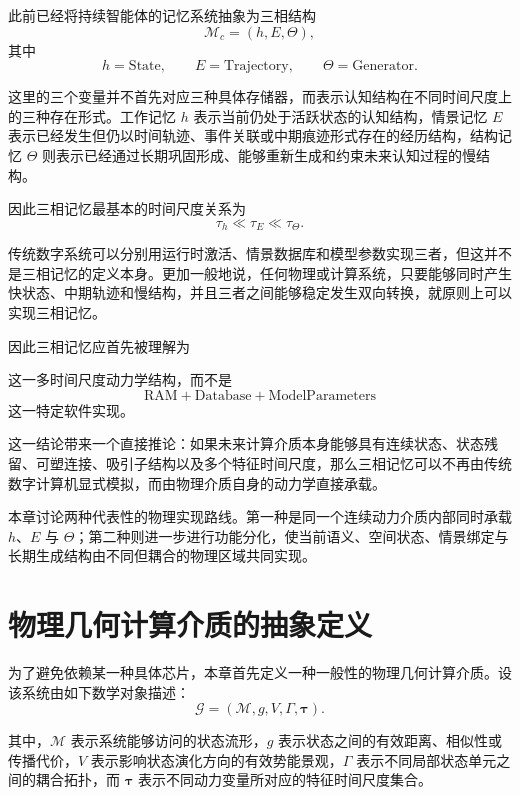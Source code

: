 此前已经将持续智能体的记忆系统抽象为三相结构
\[
\mathcal{M}_c=(h,E,\Theta),
\]
其中
\[
h=\mathrm{State},
\qquad
E=\mathrm{Trajectory},
\qquad
\Theta=\mathrm{Generator}.
\]

这里的三个变量并不首先对应三种具体存储器，而表示认知结构在不同时间尺度上的三种存在形式。工作记忆 $h$ 表示当前仍处于活跃状态的认知结构，情景记忆 $E$ 表示已经发生但仍以时间轨迹、事件关联或中期痕迹形式存在的经历结构，结构记忆 $\Theta$ 则表示已经通过长期巩固形成、能够重新生成和约束未来认知过程的慢结构。

因此三相记忆最基本的时间尺度关系为
\[
\tau_h \ll \tau_E \ll \tau_\Theta.
\]

传统数字系统可以分别用运行时激活、情景数据库和模型参数实现三者，但这并不是三相记忆的定义本身。更加一般地说，任何物理或计算系统，只要能够同时产生快状态、中期轨迹和慢结构，并且三者之间能够稳定发生双向转换，就原则上可以实现三相记忆。

因此三相记忆应首先被理解为
\begin{statementbox}
\centering
{}
\end{statementbox}
这一多时间尺度动力学结构，而不是
\[
\mathrm{RAM}
+
\mathrm{Database}
+
\mathrm{ModelParameters}
\]
这一特定软件实现。

这一结论带来一个直接推论：如果未来计算介质本身能够具有连续状态、状态残留、可塑连接、吸引子结构以及多个特征时间尺度，那么三相记忆可以不再由传统数字计算机显式模拟，而由物理介质自身的动力学直接承载。

本章讨论两种代表性的物理实现路线。第一种是同一个连续动力介质内部同时承载 $h$、$E$ 与 $\Theta$；第二种则进一步进行功能分化，使当前语义、空间状态、情景绑定与长期生成结构由不同但耦合的物理区域共同实现。

\section{物理几何计算介质的抽象定义}

为了避免依赖某一种具体芯片，本章首先定义一种一般性的物理几何计算介质。设该系统由如下数学对象描述：
\[
\mathcal{G}
=
(
\mathcal{M},
g,
V,
\Gamma,
\boldsymbol{\tau}
).
\]

其中，$\mathcal{M}$ 表示系统能够访问的状态流形，$g$ 表示状态之间的有效距离、相似性或传播代价，$V$ 表示影响状态演化方向的有效势能景观，$\Gamma$ 表示不同局部状态单元之间的耦合拓扑，而 $\boldsymbol{\tau}$ 表示不同动力变量所对应的特征时间尺度集合。

